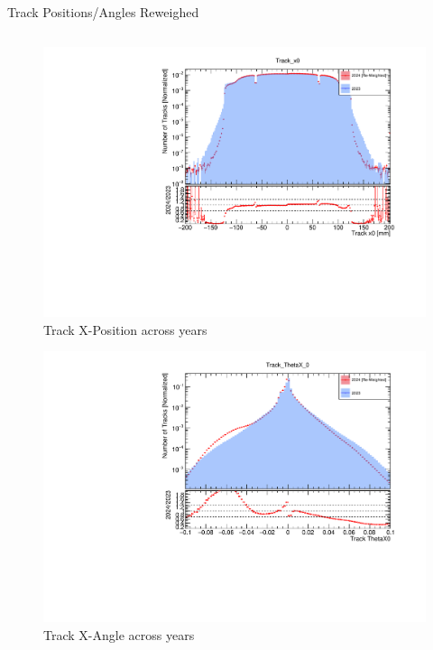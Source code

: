 \begin{frame}{Track Positions/Angles Reweighed}
    \begin{columns}
        \begin{column}{0.5\linewidth}
            \vspace{-0.4cm}
            \begin{figure}
                \includegraphics[width=\linewidth]{./ReweighedPlots/Track_x0_Reweighted.pdf}
                \caption{Track X-Position across years}
            \end{figure}
            \vspace{-1cm}
            \begin{figure}
                \includegraphics[width=\linewidth]{./ReweighedPlots/Track_ThetaX_0_Reweighted.pdf}
                \caption{Track X-Angle across years}

\end{figure}
\end{column}
\end{columns}
\end{frame}

